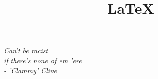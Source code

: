 \documentclass{article}
\title{\textbf{\LaTeX}}
\author{}
\date{}
\begin{document}
\maketitle
\center
\textit{Can't be racist\\if there's none of em 'ere}
\\ \textit{- 'Clammy' Clive}
\endcenter
\end{document}
